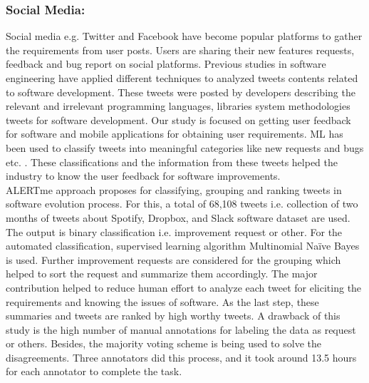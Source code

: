 \subsubsection{Social Media: }
Social media e.g. Twitter and Facebook have become popular platforms to gather the
requirements from user posts. Users are sharing their new features requests, feedback and bug
report on social platforms. Previous studies \cite{Singer:2014} \cite{Prasetyo} \cite{Achananuparp:2012} in software engineering have applied different techniques to analyzed tweets contents related to software development. These tweets were posted by developers describing the relevant and irrelevant programming languages, libraries system methodologies tweets for software development. Our study is focused on getting user feedback for software and mobile applications for obtaining user requirements. ML has been used to classify tweets into meaningful
categories like new requests and bugs etc. \cite{guzman2017} \cite{williams2017} . These classifications and the information
from these tweets helped the industry to know the user feedback for software improvements.\\

	ALERTme \cite{guzman2017} approach proposes for classifying, grouping and ranking tweets in software
evolution process. For this, a total of 68,108 tweets i.e. collection of two months of tweets about
Spotify, Dropbox, and Slack software dataset are used. The output is binary classification i.e.
improvement request or other. For the automated classification, supervised learning algorithm Multinomial Naïve Bayes is used.  
Further improvement requests are considered for the
grouping which helped to sort the request and summarize them accordingly. The major contribution helped to reduce human
effort to analyze each tweet for eliciting the requirements and knowing the issues of software. As the last step, these summaries and tweets are ranked by high
worthy tweets. A drawback of this study is the high number of manual annotations for labeling
the data as request or others. Besides, the majority voting scheme is being used to solve the
disagreements. Three annotators did this process, and it took around 13.5 hours for each
annotator to complete the task.\\

